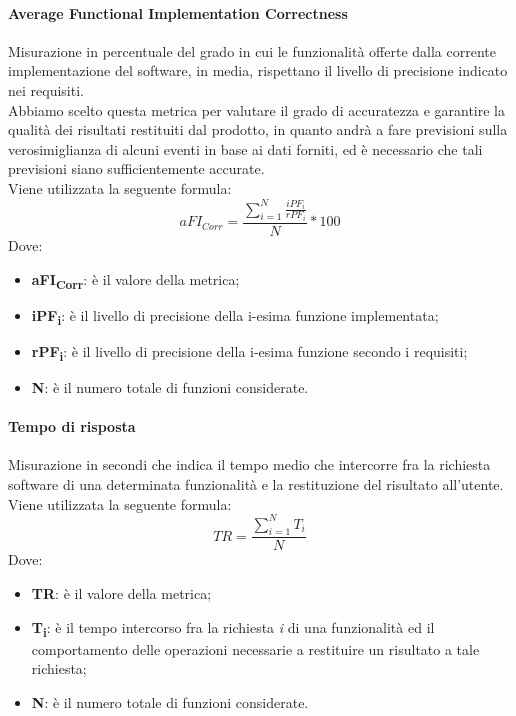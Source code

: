\paragraph{Average Functional Implementation Correctness}\Spazio
Misurazione in percentuale del grado in cui le funzionalità offerte dalla corrente implementazione del software, in media, rispettano il livello di precisione indicato nei requisiti.\\
Abbiamo scelto questa metrica per valutare il grado di accuratezza e garantire la qualità dei risultati restituiti dal prodotto, in quanto andrà a fare previsioni sulla verosimiglianza di alcuni eventi in base ai dati forniti, ed è necessario che tali previsioni siano sufficientemente accurate.\\
Viene utilizzata la seguente formula:
$$aFI_{Corr}=\frac{\sum\limits_{i=1}^N\frac{iPF_i}{rPF_i}}{N}*100$$
Dove:
\begin{itemize}
	\item{\textbf{aFI\textsubscript{Corr}}: è il valore della metrica;}
	\item{\textbf{iPF\textsubscript{i}}: è il livello di precisione della i-esima funzione implementata;}
	\item{\textbf{rPF\textsubscript{i}}: è il livello di precisione della i-esima funzione secondo i requisiti;}
	\item{\textbf{N}: è il numero totale di funzioni considerate.}
\end{itemize}

\paragraph{Tempo di risposta}\Spazio
Misurazione in secondi che indica il tempo medio che intercorre fra la richiesta software di una determinata funzionalità e la restituzione del risultato all'utente. \\
Viene utilizzata la seguente formula:
$$TR=\frac{\sum\limits_{i=1}^N{T_i}}{N}$$
Dove:
\begin{itemize}
	\item{\textbf{TR}: è il valore della metrica;}
	\item{\textbf{T\textsubscript{i}}: è il tempo intercorso fra la richiesta \emph{i} di una funzionalità ed il comportamento delle operazioni necessarie a restituire un risultato a tale richiesta;}
	\item{\textbf{N}: è il numero totale di funzioni considerate.}
\end{itemize}

